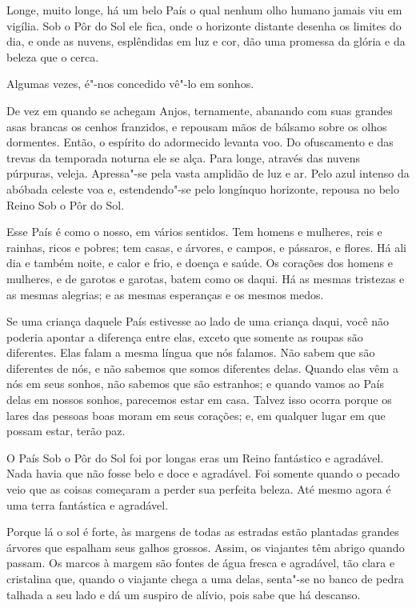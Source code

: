  

Longe, muito longe, há um belo País o qual nenhum olho humano jamais viu
em vigília. Sob o Pôr do Sol ele fica, onde o horizonte distante desenha
os limites do dia, e onde as nuvens, esplêndidas em luz e cor, dão uma
promessa da glória e da beleza que o cerca.

Algumas vezes, é"-nos concedido vê"-lo em sonhos.

De vez em quando se achegam Anjos, ternamente, abanando com suas grandes
asas brancas os cenhos franzidos, e repousam mãos de bálsamo sobre os
olhos dormentes. Então, o espírito do adormecido levanta voo. Do
ofuscamento e das trevas da temporada noturna ele se alça. Para longe,
através das nuvens púrpuras, veleja. Apressa"-se pela vasta amplidão de
luz e ar. Pelo azul intenso da abóbada celeste voa e, estendendo"-se pelo
longínquo horizonte, repousa no belo Reino Sob o Pôr do Sol.

Esse País é como o nosso, em vários sentidos. Tem homens e mulheres,
reis e rainhas, ricos e pobres; tem casas, e árvores, e campos, e
pássaros, e flores. Há ali dia e também noite, e calor e frio, e doença
e saúde. Os corações dos homens e mulheres, e de garotos e garotas,
batem como os daqui. Há as mesmas tristezas e as mesmas alegrias; e as
mesmas esperanças e os mesmos medos.

Se uma criança daquele País estivesse ao lado de uma criança daqui, você
não poderia apontar a diferença entre elas, exceto que somente as roupas
são diferentes. Elas falam a mesma língua que nós falamos. Não sabem que
são diferentes de nós, e não sabemos que somos diferentes delas. Quando
elas vêm a nós em seus sonhos, não sabemos que são estranhos; e quando
vamos ao País delas em nossos sonhos, parecemos estar em casa. Talvez
isso ocorra porque os lares das pessoas boas moram em seus corações; e,
em qualquer lugar em que possam estar, terão paz.

O País Sob o Pôr do Sol foi por longas eras um Reino fantástico e
agradável. Nada havia que não fosse belo e doce e agradável. Foi somente
quando o pecado veio que as coisas começaram a perder sua perfeita
beleza. Até mesmo agora é uma terra fantástica e agradável.

Porque lá o sol é forte, às margens de todas as estradas estão plantadas
grandes árvores que espalham seus galhos grossos. Assim, os viajantes
têm abrigo quando passam. Os marcos à margem são fontes de água fresca e
agradável, tão clara e cristalina que, quando o viajante chega a uma
delas, senta"-se no banco de pedra talhada a seu lado e dá um suspiro de
alívio, pois sabe que há descanso.

